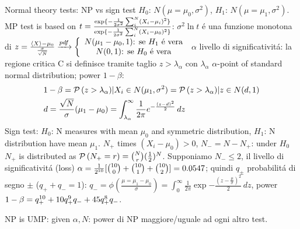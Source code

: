 \documentclass[asd-beamer.tex]{subfiles}
\begin{document}
\begin{wordonframe}{Normal theory tests: NP vs sign test}
$H_0$: $N(\mu=\mu_0,\sigma^2)$, $H_1$: $N(\mu=\mu_1,\sigma^2)$.
MP test is based on $t=\frac{\text{exp}\{-\frac{1}{2\sigma^2}\sum_i^N(X_i-\mu_i)^2\}}{\text{exp}\{-\frac{1}{2\sigma^2}\sum_i^N(X_i-\mu_0)^2\}}$: $\sigma^2\ln{t}$ \'e una funzione monotona di $z=\frac{\langle X \rangle-\mu_0}{\frac{\sigma}{\sqrt{N}}}\xrightarrow{pdf}\left\{\begin{array}{c}N(\mu_1-\mu_0,1) \text{: se $H_1$ \'e vera}\\
N(0,1) \text{: se $H_0$ \'e vera}
\end{array}\right.$
$\alpha$ livello di significativit\'a: la regione critica C si definisce tramite taglio $z>\lambda_{\alpha}$ con $\lambda_{\alpha}$ $\alpha$-point of standard normal distribution; power $1-\beta$:
\begin{align*}
&1-\beta=\operatorname{\mathcal{P}}{(z>\lambda_{\alpha})|X_i\in N(\mu_1,\sigma^2)}=\operatorname{\mathcal{P}}{(z>\lambda_{\alpha})|z\in N(d,1)}\\
&d=\frac{\sqrt{N}}{\sigma}(\mu_1-\mu_0)=\int_{\lambda_{\alpha}}^{\infty}\frac{1}{2\pi}e^{-\frac{(z-d)^2}{2}}\,dz
\end{align*}
Sign test:
$H_0$: N measures with mean $\mu_0$ and symmetric distribution, $H_1$: N distribution have mean $\mu_1$. $N_+$ times $(X_i-\mu_0)>0$, $N_-=N-N_+$: under $H_0$ $N_+$ is distributed as $\operatorname{\mathcal{P}}{(N_+=r)}=\binom{N}{r}(\frac{1}{2})^N$. Supponiamo $N_-\leq2$, il livello di significativit\'a  (loss) $\alpha=\frac{1}{2^{10}}[\binom{10}{0}+\binom{10}{1}+\binom{10}{2}]=0.0547$; quindi $q_{\pm}$ probabilit\'a di segno $\pm$ ($q_++q_-=1$): $q_-=\phi(\frac{\mu=\mu_1-\mu_0}{\sigma})=\int_0^{\infty}\frac{1}{2\pi}\exp{-\frac{(z-\frac{\mu}{\sigma})^2}{2}}\,dz$, power $1-\beta=q_+^{10}+10q_+^9q_-+45q_+^8q_-$.

NP is UMP: given $\alpha, N$: power di NP maggiore/uguale ad ogni altro test.
\end{wordonframe}
\end{document}
